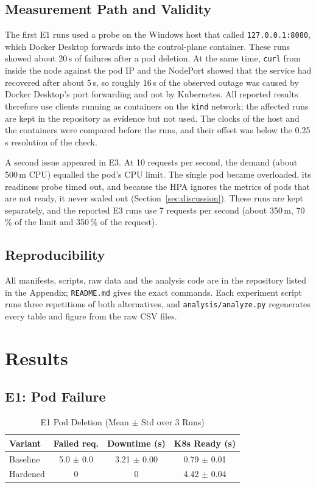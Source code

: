 \documentclass[conference,a4paper]{IEEEtran}
\begin{document}
\subsection{Measurement Path and Validity}
\label{sec:validity}
The first E1 runs used a probe on the Windows host that called \texttt{127.0.0.1:8080}, which Docker Desktop forwards into the control-plane container. These runs showed about 20\,s of failures after a pod deletion. At the same time, \texttt{curl} from inside the node against the pod IP and the NodePort showed that the service had recovered after about 5\,s, so roughly 16\,s of the observed outage was caused by Docker Desktop's port forwarding and not by Kubernetes. All reported results therefore use clients running as containers on the \texttt{kind} network; the affected runs are kept in the repository as evidence but not used. The clocks of the host and the containers were compared before the runs, and their offset was below the 0.25\,s resolution of the check.

A second issue appeared in E3. At 10 requests per second, the demand (about 500\,m CPU) equalled the pod's CPU limit. The single pod became overloaded, its readiness probe timed out, and because the HPA ignores the metrics of pods that are not ready, it never scaled out (Section~\ref{sec:discussion}). These runs are kept separately, and the reported E3 runs use 7 requests per second (about 350\,m, 70\,\% of the limit and 350\,\% of the request).

\subsection{Reproducibility}
All manifests, scripts, raw data and the analysis code are in the repository listed in the Appendix; \texttt{README.md} gives the exact commands. Each experiment script runs three repetitions of both alternatives, and \texttt{analysis/analyze.py} regenerates every table and figure from the raw CSV files.

\section{Results}
\label{sec:results}

\subsection{E1: Pod Failure}
\begin{table}[htbp]
	\caption{E1 Pod Deletion (Mean $\pm$ Std over 3 Runs)}
	\label{tab:e1}
	\centering
	\footnotesize
	\begin{tabular}{|l|c|c|c|}
		\hline
		\textbf{Variant} & \textbf{Failed req.} & \textbf{Downtime (s)} & \textbf{K8s Ready (s)} \\
		\hline
		Baseline & 5.0 $\pm$ 0.0 & 3.21 $\pm$ 0.00 & 0.79 $\pm$ 0.01 \\
		\hline
		Hardened & 0 & 0 & 4.42 $\pm$ 0.04 \\
		\hline
	\end{tabular}
\end{table}
\end{document}
